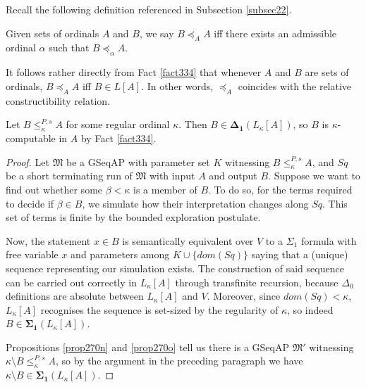 \documentclass[12pt]{article}
\numberwithin{equation}{section}
\begin{document}
Recall the following definition referenced in Subsection \ref{subsec22}.

\begin{defi}
Given sets of ordinals $A$ and $B$, we say $B \preceq_A A$ iff there exists an admissible ordinal $\alpha$ such that $B \preceq_{\alpha} A$.
\end{defi}

\begin{rem}\label{rem336}
It follows rather directly from Fact \ref{fact334} that whenever $A$ and $B$ are sets of ordinals, $B \preceq_A A$ iff $B \in L[A]$. In other words, $\preceq_A$ coincides with the relative constructibility relation.
\end{rem}

\begin{lem}\label{lem269}
Let $B \leq^{P, s}_{\kappa} A$ for some regular ordinal $\kappa$. Then $B \in \mathbf{\Delta_1}(L_{\kappa}[A])$, so $B$ is $\kappa$-computable in $A$ by Fact \ref{fact334}.
\end{lem}

\begin{proof}
Let $\mathfrak{M}$ be a GSeqAP with parameter set $K$ witnessing $B \leq^{P, s}_{\kappa} A$, and $Sq$ be a short terminating run of $\mathfrak{M}$ with input $A$ and output $B$. Suppose we want to find out whether some $\beta < \kappa$ is a member of $B$. To do so, for the terms required to decide if $\beta \in B$, we simulate how their interpretation changes along $Sq$. This set of terms is finite by the bounded exploration postulate. 

Now, the statement $x \in B$ is semantically equivalent over $V$ to a $\Sigma_1$ formula with free variable $x$ and parameters among $K \cup \{dom(Sq)\}$ saying that a (unique) sequence representing our simulation exists. The construction of said sequence can be carried out correctly in $L_{\kappa}[A]$ through transfinite recursion, because $\Delta_0$ definitions are absolute between $L_{\kappa}[A]$ and $V$. Moreover, since $dom(Sq)  < \kappa$, $L_{\kappa}[A]$ recognises the sequence is set-sized by the regularity of $\kappa$, so indeed $B \in \mathbf{\Sigma_1}(L_{\kappa}[A])$.

Propositions \ref{prop270n} and \ref{prop270o} tell us there is a GSeqAP $\mathfrak{M}'$ witnessing $\kappa \setminus B \leq^{P, s}_{\kappa} A$, so by the argument in the preceding paragraph we have $\kappa \setminus B \in \mathbf{\Sigma_1}(L_{\kappa}[A])$.
\end{proof}
\end{document}
